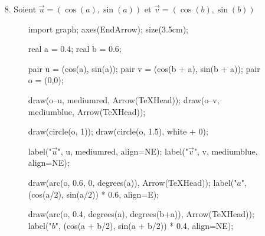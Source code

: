 \begin{prv}
	\begin{enumerate}
		\item[8.] 
			Soient $\vec{u} = (\cos(a), \sin(a))$ et $\vec{v} = (\cos(b), \sin(b))$\\
			\begin{minipage}{\linewidth}
				\begin{wrapfigure}{r}{1cm}
					\centering
					\begin{asy}
						import graph;
						axes(EndArrow);
						size(3.5cm);

						real a = 0.4;
						real b = 0.6;

						pair u = (cos(a), sin(a));
						pair v = (cos(b + a), sin(b + a));
						pair o = (0,0);

						draw(o--u, mediumred, Arrow(TeXHead));
						draw(o--v, mediumblue, Arrow(TeXHead));

						draw(circle(o, 1));
						draw(circle(o, 1.5), white + 0);

						label("$\vec{u}$", u, mediumred, align=NE);
						label("$\vec{v}$", v, mediumblue, align=NE);

						draw(arc(o, 0.6, 0, degrees(a)), Arrow(TeXHead));
						label("$a$", (cos(a/2), sin(a/2)) * 0.6, align=E);

						draw(arc(o, 0.4, degrees(a), degrees(b+a)), Arrow(TeXHead));
						label("$b$", (cos(a + b/2), sin(a + b/2)) * 0.4, align=NE);


\end{asy}
\end{wrapfigure}
\end{minipage}
\end{enumerate}
\end{prv}
